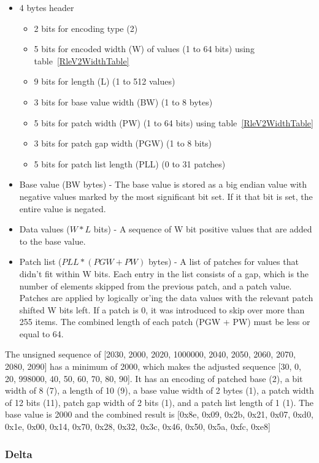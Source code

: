 \documentclass{article}
\begin{document}
\begin{itemize}
\item 4 bytes header
  \begin{itemize}
  \item 2 bits for encoding type (2)
  \item 5 bits for encoded width (W) of values (1 to 64 bits)
        using table~\ref{RleV2WidthTable}
  \item 9 bits for length (L) (1 to 512 values)
  \item 3 bits for base value width (BW) (1 to 8 bytes)
  \item 5 bits for patch width (PW) (1 to 64 bits)
        using table~\ref{RleV2WidthTable}
  \item 3 bits for patch gap width (PGW) (1 to 8 bits)
  \item 5 bits for patch list length (PLL) (0 to 31 patches)
  \end{itemize}
\item Base value (BW bytes) - The base value is stored as a big endian value
  with negative values marked by the most significant bit set. If it that
  bit is set, the entire value is negated.
\item Data values ($W * L$ bits) - A sequence of W bit positive values that
  are added to the base value.
\item Patch list ($PLL * (PGW + PW)$ bytes) - A list of patches for
  values that didn't fit within W bits. Each entry in the list
  consists of a gap, which is the number of elements skipped from the
  previous patch, and a patch value. Patches are applied by logically
  or'ing the data values with the relevant patch shifted W bits
  left. If a patch is 0, it was introduced to skip over more than 255
  items. The combined length of each patch (PGW + PW) must be less or
  equal to 64.
\end{itemize}

The unsigned sequence of [2030, 2000, 2020, 1000000, 2040, 2050, 2060,
  2070, 2080, 2090] has a minimum of 2000, which makes the adjusted
sequence [30, 0, 20, 998000, 40, 50, 60, 70, 80, 90]. It has an
encoding of patched base (2), a bit width of 8 (7), a length of 10
(9), a base value width of 2 bytes (1), a patch width of 12 bits (11),
patch gap width of 2 bits (1), and a patch list length of 1 (1). The
base value is 2000 and the combined result is [0x8e, 0x09, 0x2b, 0x21,
  0x07, 0xd0, 0x1e, 0x00, 0x14, 0x70, 0x28, 0x32, 0x3c, 0x46, 0x50,
  0x5a, 0xfc, 0xe8]

\subsubsection{Delta}
\end{document}
